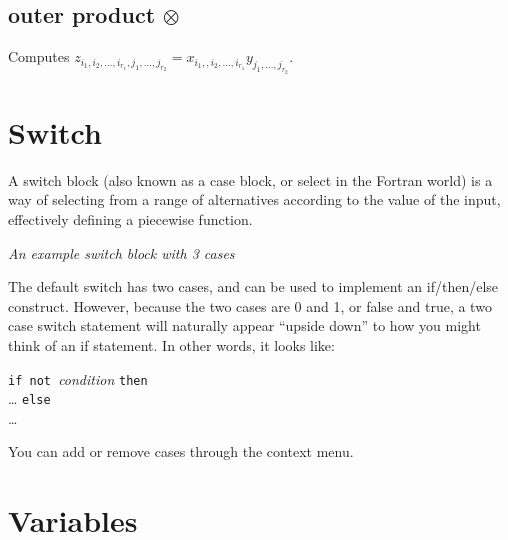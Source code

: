 \subsection{outer product $\otimes$}\label{Operation:outerProduct}
Computes $z_{i_1,i_2,\ldots,i_{r_1},j_1,\ldots,j_{r_2}} =
  x_{i_1,,i_2,\ldots,i_{r_1}}y_{j_1,\ldots,j_{r_2}}$.


\section{Switch}\label{SwitchIcon}

A switch block (also known as a case block, or select in the Fortran
world) is a way of selecting from a range of alternatives according
to the value of the input, effectively defining a piecewise function.

\begin{center}
{\em An example switch block with 3 cases}
\end{center}

The default switch has two cases, and can be used to implement an
if/then/else construct. However, because the two cases are 0 and 1,
or false and true, a two case switch statement will naturally appear
``upside down'' to how you might think of an if statement. In other
words, it looks like:

\parbox{\textwidth}{
{\tt if not }{\em condition} {\tt then}\\
 \ldots
{\tt else}\\
\ldots
}

You can add or remove cases through the context menu. 

\section{Variables}\label{Variable:constant}\label{Variable:parameter}
\label{Variable:flow}\label{Variable:integral}\label{Variable:stock}

